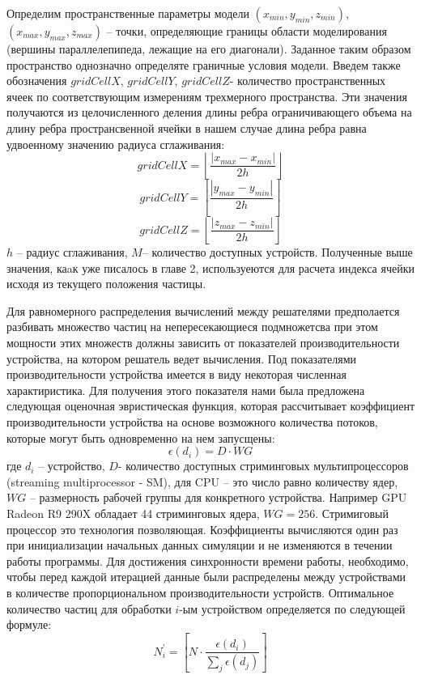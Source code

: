 Определим пространственные параметры модели
\((x_{min}, y_{min}, z_{min})\), \((x_{max}, y_{max}, z_{max})\) – точки, определяющие границы области моделирования (вершины параллелепипеда, лежащие на его диагонали). Заданное таким образом пространство однозначно определяте граничные условия модели. Введем также обозначения \(gridCellX\), \(gridCellY\), \(gridCellZ\)- количество пространственных ячеек по соответствующим измерениям трехмерного пространства. Эти значения получаются из целочисленного деления длины ребра ограничивающего объема на длину ребра пространсвенной ячейки в нашем случае длина ребра равна удвоенному значению радиуса сглаживания:
\[
  gridCellX = \left \lfloor \frac{\left |x_{max} - x_{min}  \right |}{2h} \right \rfloor
\]
\[
  gridCellY = \left \lfloor \frac{\left |y_{max} - y_{min}  \right |}{2h} \right \rfloor
\]
\[
  gridCellZ = \left \lfloor \frac{\left |z_{max} - z_{min}  \right |}{2h} \right \rfloor
\]
\(h\) – радиус сглаживания,
\(M\)– количество доступных устройств.
Полученные выше значения, каaк уже писалось в главе 2, используеются для расчета индекса ячейки исходя из текущего положения частицы.

Для равномерного распределения вычислений между решателями предполается разбивать множество частиц на непересекающиеся подмножетсва при этом мощности этих множеств должны зависить от показателей производительности устройства, на котором решатель ведет вычисления. Под показателями производительности устройства имеется в виду некоторая численная характиристика. Для получения этого показателя нами была предложена следующая оценочная эвристическая функция, которая рассчитывает коэффициент производительности устройства на основе возможного количества потоков, которые могут быть одновременно на нем запусщены:
\[
  \epsilon(d_i)=D \cdot WG
\]
где \(d_i\) – устройство, \(D\)- количество доступных стриминговых мультипроцессоров (streaming multiprocessor - SM), для CPU – это число равно количеству ядер, \(WG\) – размерность рабочей группы для конкретного устройства. Например GPU Radeon R9 290X обладает 44 стриминговых ядера, \(WG=256\). Стримиговый процессор это технология позволяющая. Коэффициенты вычисляются один раз при инициализации начальных данных симуляции и не изменяются в течении работы программы. Для достижения синхронности времени работы, необходимо, чтобы перед каждой итерацией данные были распределены между устройствами в количестве пропорциональном производительности устройств. Оптимальное количество частиц для обработки \(i\)-ым устройством определяется по следующей формуле:
\[
  N_{i}^{'}=\left [ N \cdot \frac{\epsilon(d_i)}{\sum_{j}\epsilon(d_j)} \right ]
\]

